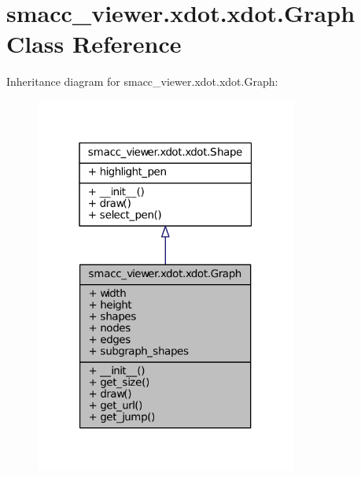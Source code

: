 \hypertarget{classsmacc__viewer_1_1xdot_1_1xdot_1_1Graph}{}\section{smacc\+\_\+viewer.\+xdot.\+xdot.\+Graph Class Reference}
\label{classsmacc__viewer_1_1xdot_1_1xdot_1_1Graph}


Inheritance diagram for smacc\+\_\+viewer.\+xdot.\+xdot.\+Graph\+:
\nopagebreak
\begin{figure}[H]
\begin{center}
\leavevmode
\includegraphics[width=244pt]{classsmacc__viewer_1_1xdot_1_1xdot_1_1Graph__inherit__graph}
\end{center}
\end{figure}



